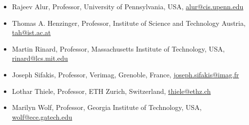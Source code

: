 \begin{itemize}
\item Rajeev Alur, Professor, University of Pennsylvania, USA, \href{mailto:alur@cis.upenn.edu}{alur@cis.upenn.edu}

\item Thomas A. Henzinger, Professor, Institute of Science and Technology Austria, \href{mailto:tah@ist.ac.at}{tah@ist.ac.at}

\item Martin Rinard, Professor, Massachusetts Institute of Technology, USA, \href{mailto:rinard@lcs.mit.edu}{rinard@lcs.mit.edu}

\item Joseph Sifakis, Professor, Verimag, Grenoble, France, \href{mailto:joseph.sifakis@imag.fr}{joseph.sifakis@imag.fr}

\item Lothar Thiele, Professor, ETH Zurich, Switzerland, \href{mailto:thiele@ethz.ch}{thiele@ethz.ch}

\item Marilyn Wolf, Professor, Georgia Institute of Technology, USA, \href{mailto:wolf@ece.gatech.edu}{wolf@ece.gatech.edu}
\end{itemize}